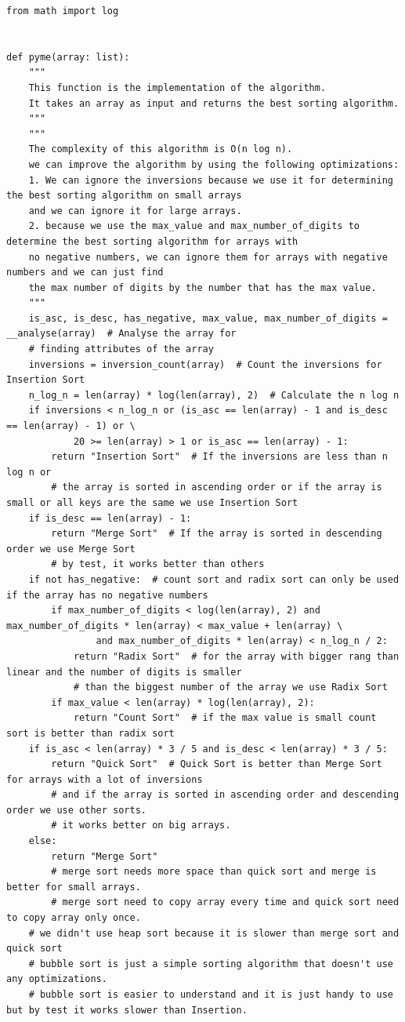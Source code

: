 \documentclass[
10pt, %
a4paper, %
oneside, %
headinclude,footinclude, %
BCOR5mm, %
]{scrartcl}
\begin{document}
\begin{lstlisting}
from math import log


def pyme(array: list):
    """
    This function is the implementation of the algorithm.
    It takes an array as input and returns the best sorting algorithm.
    """
    """
    The complexity of this algorithm is O(n log n).
    we can improve the algorithm by using the following optimizations:
    1. We can ignore the inversions because we use it for determining the best sorting algorithm on small arrays
    and we can ignore it for large arrays.
    2. because we use the max_value and max_number_of_digits to determine the best sorting algorithm for arrays with
    no negative numbers, we can ignore them for arrays with negative numbers and we can just find 
    the max number of digits by the number that has the max value.
    """
    is_asc, is_desc, has_negative, max_value, max_number_of_digits = __analyse(array)  # Analyse the array for
    # finding attributes of the array
    inversions = inversion_count(array)  # Count the inversions for Insertion Sort
    n_log_n = len(array) * log(len(array), 2)  # Calculate the n log n
    if inversions < n_log_n or (is_asc == len(array) - 1 and is_desc == len(array) - 1) or \
            20 >= len(array) > 1 or is_asc == len(array) - 1:
        return "Insertion Sort"  # If the inversions are less than n log n or
        # the array is sorted in ascending order or if the array is small or all keys are the same we use Insertion Sort
    if is_desc == len(array) - 1:
        return "Merge Sort"  # If the array is sorted in descending order we use Merge Sort
        # by test, it works better than others
    if not has_negative:  # count sort and radix sort can only be used if the array has no negative numbers
        if max_number_of_digits < log(len(array), 2) and max_number_of_digits * len(array) < max_value + len(array) \
                and max_number_of_digits * len(array) < n_log_n / 2:
            return "Radix Sort"  # for the array with bigger rang than linear and the number of digits is smaller
            # than the biggest number of the array we use Radix Sort
        if max_value < len(array) * log(len(array), 2):
            return "Count Sort"  # if the max value is small count sort is better than radix sort
    if is_asc < len(array) * 3 / 5 and is_desc < len(array) * 3 / 5:
        return "Quick Sort"  # Quick Sort is better than Merge Sort for arrays with a lot of inversions
        # and if the array is sorted in ascending order and descending order we use other sorts.
        # it works better on big arrays.
    else:
        return "Merge Sort"
        # merge sort needs more space than quick sort and merge is better for small arrays.
        # merge sort need to copy array every time and quick sort need to copy array only once.
    # we didn't use heap sort because it is slower than merge sort and quick sort
    # bubble sort is just a simple sorting algorithm that doesn't use any optimizations.
    # bubble sort is easier to understand and it is just handy to use but by test it works slower than Insertion.



\end{lstlisting}
\end{document}
